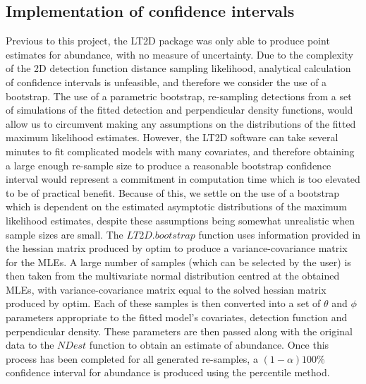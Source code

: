 \documentclass[11pt]{article}
\begin{document}
\begin{multicols}{2}
\subsection{Implementation of confidence intervals}
Previous to this project, the LT2D package was only able to produce point estimates for abundance, with no measure of uncertainty. Due to the complexity of the 2D detection function distance sampling likelihood, analytical calculation of confidence intervals is unfeasible, and therefore we consider the use of a bootstrap. The use of a parametric bootstrap, re-sampling detections from a set of simulations of the fitted detection and perpendicular density functions, would allow us to circumvent making any assumptions on the distributions of the fitted maximum likelihood estimates. However, the LT2D software can take several minutes to fit complicated models with many covariates, and therefore obtaining a large enough re-sample size to produce a reasonable bootstrap confidence interval would represent a commitment in computation time which is too elevated to be of practical benefit.  Because of this, we settle on the use of a bootstrap which is dependent on the estimated asymptotic distributions of the maximum likelihood estimates, despite these assumptions being somewhat unrealistic when sample sizes are small.  The $LT2D.bootstrap$ function uses information provided in the hessian matrix produced by optim to produce a variance-covariance matrix for the MLEs. A large number of samples (which can be selected by the user) is then taken from the multivariate normal distribution centred at the obtained MLEs, with variance-covariance matrix equal to the solved hessian matrix produced by optim. Each of these samples is then converted into a set of $\theta$ and $\phi$ parameters appropriate to the fitted model's covariates, detection function and perpendicular density. These parameters are then passed along with the original data to the $NDest$ function to obtain an estimate of abundance. Once this process has been completed for all generated re-samples, a $(1-\alpha) 100\%$ confidence interval for abundance is produced using the percentile method. 


\end{multicols}
\end{document}
